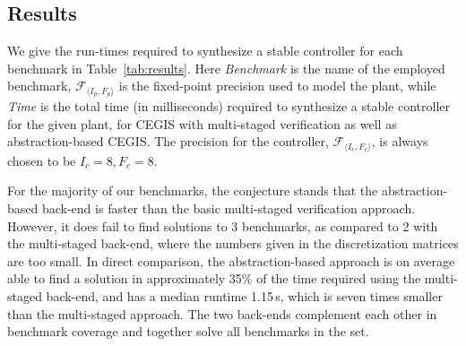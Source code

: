 \documentclass[runningheads,a4paper]{llncs}
\begin{document}
\subsection{Results}

We give the run-times required to synthesize a stable controller for each
benchmark in Table~\ref{tab:results}.  
Here \textit{Benchmark} is the name of the employed
benchmark, $\mathcal{F}_{\langle I_p,F_p \rangle}$ is the fixed-point precision used
to model the plant, while \textit{Time}
is the total time (in milliseconds) required to synthesize a stable controller
for the given plant, for CEGIS with multi-staged verification as well as
abstraction-based CEGIS. The precision for the controller,
$\mathcal{F}_{\langle I_c,F_c \rangle}$, is always chosen to be $I_c = 8, F_c = 8$.

For the majority of our benchmarks, the conjecture stands that the abstraction-based back-end
is faster than the basic multi-staged verification approach. However, it does fail to
find solutions to 3 benchmarks, as compared to 2 with the multi-staged back-end, where
the numbers given in the discretization matrices are too small. In direct comparison, the
abstraction-based approach is on average able to find a solution in approximately 35\% of
the time required using the multi-staged back-end, and has a median runtime 1.15\,s, which is
seven times smaller than the multi-staged approach. The two back-ends complement each other
in benchmark coverage and together solve all benchmarks in the set.
\end{document}
